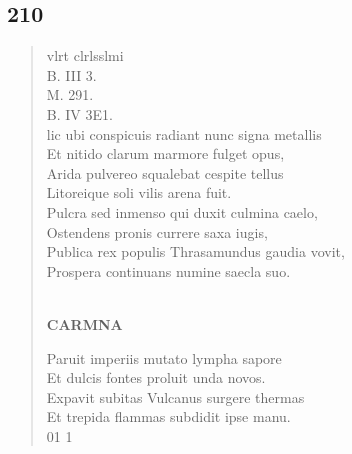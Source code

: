 \documentclass[11pt, a4paper]{report}
\begin{document}
            \subsection*{210}
      \begin{verse}
      vlrt clrlsslmi \\ B. III 3. \\ M. 291. \\ B. IV 3E1. \\ lic ubi conspicuis radiant nunc signa metallis \\ Et nitido clarum marmore fulget opus, \\ Arida pulvereo squalebat cespite tellus \\ Litoreique soli vilis arena fuit. \\ Pulcra sed inmenso qui duxit culmina caelo, \\ Ostendens pronis currere saxa iugis, \\ Publica rex populis Thrasamundus gaudia vovit, \\ Prospera continuans numine saecla suo. \\ 
        ﻿\pagebreak 
    \begin{center} \textbf{CARMNA} \end{center} \marginpar{[180]} Paruit imperiis mutato lympha sapore \\ Et dulcis fontes proluit unda novos. \\ Expavit subitas Vulcanus surgere thermas \\ Et trepida flammas subdidit ipse manu. \\ 01 1 \\ 
      \end{verse}
  
\end{document}
